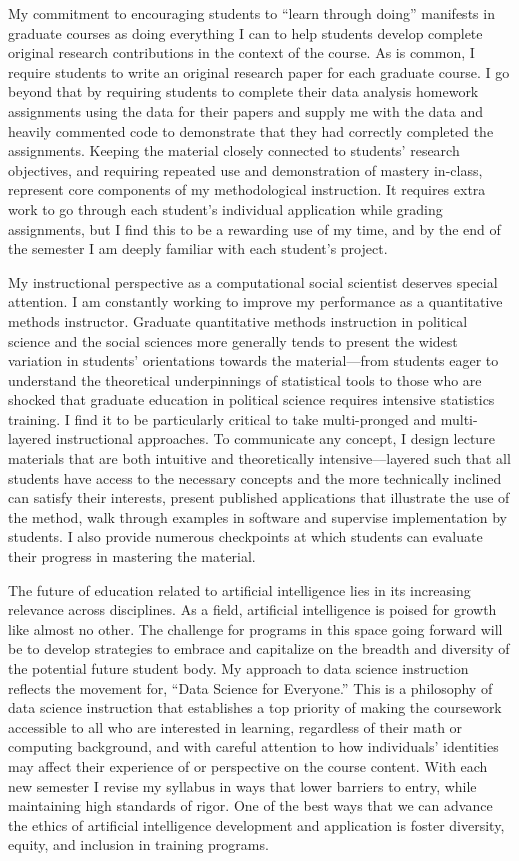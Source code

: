 \documentclass[a4paper,12pt]{article}
\begin{document}
My commitment to encouraging students to ``learn through doing'' manifests in graduate courses as doing everything I can to help students develop complete original research contributions in the context of the course. As is common, I require students to write an original research paper for each graduate course. I go beyond that by requiring students to complete their data analysis homework assignments using the data for their papers and supply me with the data and heavily commented code to demonstrate that they had correctly completed the assignments. Keeping the material closely connected to students' research objectives, and requiring repeated use and demonstration of mastery in-class, represent core components of my methodological instruction. It requires extra work to go through each student's individual application while grading assignments, but I find this to be a rewarding use of my time, and by the end of the semester I am deeply familiar with each student's project. 

My instructional perspective as a computational social scientist deserves special attention. I am constantly working to improve my performance as a quantitative methods instructor. Graduate quantitative methods instruction in political science and the social sciences more generally tends to present the widest variation in students' orientations towards the material---from students eager to understand the theoretical underpinnings of statistical tools to those who are shocked that graduate education in political science requires intensive statistics training. I find it to be particularly critical to take multi-pronged and multi-layered instructional approaches. To communicate any concept, I design lecture materials that are both intuitive and theoretically intensive---layered such that all students have access to the necessary concepts and the more technically inclined can satisfy their interests, present published applications that illustrate the use of the method, walk through examples in software and supervise implementation by students. I also provide numerous checkpoints at which students can evaluate their progress in mastering the material. 

The future of education related to artificial intelligence lies in its increasing relevance across disciplines. As a field, artificial intelligence is poised for growth like almost no other. The challenge for programs in this space going forward will be to develop strategies to embrace and capitalize on the breadth and diversity of the potential future student body. My approach to data science instruction reflects the movement for, ``Data Science for Everyone.'' This is a philosophy of data science instruction that establishes a top priority of making the coursework accessible to all who are interested in learning, regardless of their math or computing background, and with careful attention to how individuals' identities may affect their experience of or perspective on the course content. With each new semester I revise my syllabus in ways that lower barriers to entry, while maintaining high standards of rigor. One of the best ways that we can advance the ethics of artificial intelligence development and application is foster diversity, equity, and inclusion in training programs. 
\end{document}
